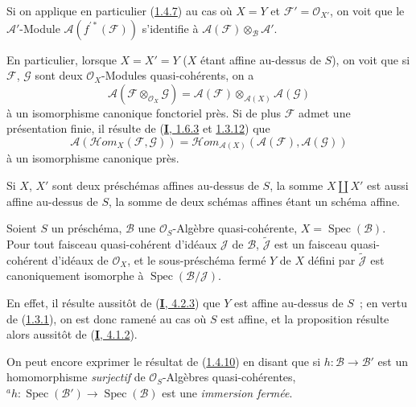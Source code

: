Si on applique en particulier (\hyperref[II.1.4.7-fr]{1.4.7}) au cas où
$X=Y$ et $\mathcal{F}'=\mathcal{O}_{X'}$, on voit que le
$\mathcal{A}'$-Module $\mathcal{A}(f^{\prime*}(\mathcal{F}))$ s'identifie à
$\mathcal{A}(\mathcal{F})\otimes_{\mathcal{B}}\mathcal{A}'$.

\begin{env}[1.4.8]
\label{II.1.4.8-fr}
En particulier, lorsque $X=X'=Y$ ($X$ étant affine au-dessus de $S$), on voit
que si $\mathcal{F}$, $\mathcal{G}$ sont deux $\mathcal{O}_X$-Modules
quasi-cohérents, on a
\[
  \mathcal{A}(\mathcal{F}\otimes_{\mathcal{O}_X}\mathcal{G})
  =\mathcal{A}(\mathcal{F})\otimes_{\mathcal{A}(X)}\mathcal{A}(\mathcal{G})
  \tag{1.4.8.1}\label{II.1.4.8.1-fr}
\]
à un isomorphisme canonique fonctoriel près. Si de plus $\mathcal{F}$ admet
une présentation finie, il résulte de
(\hyperref[I.1.6.3-fr]{\textbf{I}, 1.6.3} et
\hyperref[I.1.3.12-fr]{1.3.12}) que
\[
  \mathcal{A}(\mathcal{H}om_X(\mathcal{F},\mathcal{G}))
  =\mathcal{H}om_{\mathcal{A}(X)}
    (\mathcal{A}(\mathcal{F}),\mathcal{A}(\mathcal{G}))
  \tag{1.4.8.2}\label{II.1.4.8.2-fr}
\]
à un isomorphisme canonique près.
\end{env}

\begin{remark}[1.4.9]
\label{II.1.4.9-fr}
Si $X$, $X'$ sont deux préschémas affines au-dessus de $S$, la somme
$X\amalg X'$ est aussi affine au-dessus de $S$, la somme de deux schémas
affines étant un schéma affine.
\end{remark}

\begin{proposition}[1.4.10]
\label{II.1.4.10-fr}
Soient $S$ un préschéma, $\mathcal{B}$ une $\mathcal{O}_S$-Algèbre
quasi-cohérente, $X=\operatorname{Spec}(\mathcal{B})$. Pour tout faisceau
quasi-cohérent d'idéaux $\mathcal{J}$ de $\mathcal{B}$,
$\widetilde{\mathcal{J}}$ est un faisceau quasi-cohérent d'idéaux de
$\mathcal{O}_X$, et le sous-préschéma fermé $Y$ de $X$ défini par
$\widetilde{\mathcal{J}}$ est canoniquement isomorphe à
$\operatorname{Spec}(\mathcal{B}/\mathcal{J})$.
\end{proposition}

En effet, il résulte aussitôt de (\hyperref[I.4.2.3-fr]{\textbf{I}, 4.2.3}) que $Y$
est affine au-dessus de $S$~; en vertu de
(\hyperref[II.1.3.1-fr]{1.3.1}), on est donc ramené au cas où $S$ est affine,
et la proposition résulte alors aussitôt de
(\hyperref[I.4.1.2-fr]{\textbf{I}, 4.1.2}).

On peut encore exprimer le résultat de
(\hyperref[II.1.4.10-fr]{1.4.10}) en disant que si
$h:\mathcal{B}\to\mathcal{B}'$ est un homomorphisme \emph{surjectif} de
$\mathcal{O}_S$-Algèbres quasi-cohérentes,
${}^a h:\operatorname{Spec}(\mathcal{B}')\to
\operatorname{Spec}(\mathcal{B})$ est une \emph{immersion fermée}.

